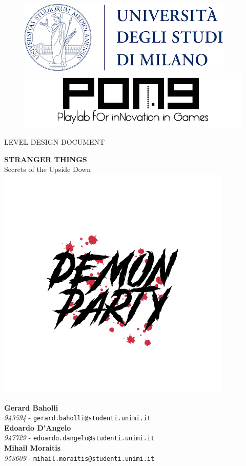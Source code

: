 \thispagestyle{empty}
{

	\begin{figure}
		\begin{minipage}{0.5\textwidth}
			\centering
			\includegraphics[width=0.6\linewidth]{images/logos/unimi_logo.png}
		\end{minipage}\hfill
		\begin{minipage}{0.5\textwidth}
			\centering
			\includegraphics[width=0.6\linewidth]{images/logos/pong_logo.png}
		\end{minipage}
	\end{figure}

	\vspace*{0.6cm}
	\begin{center}
		\Huge LEVEL DESIGN DOCUMENT\\
	\end{center}
	
	\vspace{0.6cm}
	\begin{center}
		\Huge \textbf{STRANGER THINGS}\\
		\Huge {Secrets of the Upside Down}\\
		\includegraphics[width=0.7\linewidth]{images/logos/demonparty_logo.jpg}\\[4ex]
	\end{center}

	\vfill
	\textbf{Gerard Baholli}\\
	\textit{943594} - \texttt{gerard.baholli@studenti.unimi.it}\\
	
	\textbf{Edoardo D'Angelo}\\
	\textit{947729} - \texttt{edoardo.dangelo@studenti.unimi.it}\\
	
	\textbf{Mihail Moraitis}\\
	\textit{953609} - \texttt{mihail.moraitis@studenti.unimi.it}\\

}